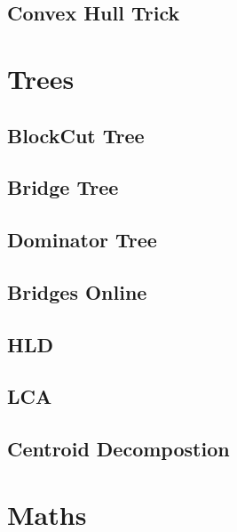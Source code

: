 \subsection{Convex Hull Trick}
\raggedbottom

\section{Trees}
\subsection{BlockCut Tree}
\raggedbottom
\subsection{Bridge Tree}
\raggedbottom
\subsection{Dominator Tree}
\raggedbottom
\subsection{Bridges Online}
\raggedbottom
\subsection{HLD}
\raggedbottom
\subsection{LCA}
\raggedbottom
\subsection{Centroid Decompostion}
\raggedbottom

\section{Maths}
